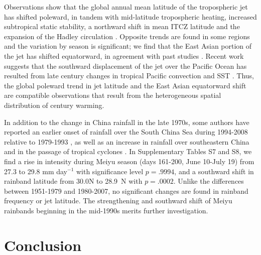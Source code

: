 \documentclass[draft,grl]{AGUTeX}
\begin{document}
\begin{article}
\color{blue} 
	 Observations show that the global annual mean latitude of the tropospheric jet has shifted poleward, in tandem with mid-latitude tropospheric heating, increased subtropical static stability, a northward shift in mean ITCZ latitude and the expansion of the Hadley circulation \citep{Fu2006,Archer2008,Fu2011}. Opposite trends are found in some regions and the variation by season is significant;  we find that the East Asian portion of the jet has shifted equatorward, in agreement with past studies \citep{Yu2007, Archer2008}. Recent work suggests that the southward displacement of the jet over the Pacific Ocean has resulted from late  century changes in tropical Pacific convection and SST \citep{Park2014a}. Thus, the global poleward trend in jet latitude and the East Asian equatorward shift are compatible observations that result from the heterogeneous spatial distribution of  century warming.
	 
	 In addition to the change in China rainfall in the late 1970s, some authors have reported an earlier onset of rainfall over the South China Sea during 1994-2008 relative to 1979-1993 \citep{Kajikawa2012}, as well as an increase in rainfall over southeastern China and in the passage of tropical cyclones \citep{Kwon2007,Chang2014}. In Supplementary Tables S7 and S8, we find a rise in intensity during Meiyu season (days 161-200, June 10-July 19) from 27.3 to 29.8 mm day$^{-1}$ with significance level $p=.9994$, and a southward shift in rainband latitude from 30.0\textdegree N to 28.9\textdegree\ N with $p=.0002$. Unlike the differences between 1951-1979 and 1980-2007, no significant changes are found in rainband frequency or jet latitude. The strengthening and southward shift of Meiyu rainbands beginning in the mid-1990s merits further investigation.
		
\section{Conclusion}


\end{article}
\end{document}
